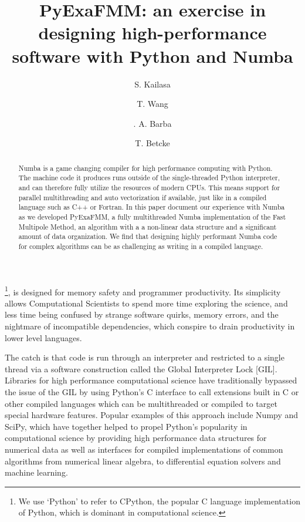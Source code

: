 \documentclass{IEEEcsmag}
\begin{document}

\title{PyExaFMM: an exercise in designing high-performance software with Python and Numba}

\author{S. Kailasa}

\author{T. Wang}

\author{. A. Barba}

\author{T. Betcke}


\begin{abstract}
    Numba is a game changing compiler for high performance computing with Python. The machine code it produces runs outside of the single-threaded Python interpreter, and can therefore fully utilize the resources of modern CPUs. This means support for parallel multithreading and auto vectorization if available, just like in a compiled language such as C++ or Fortran. In this paper document our experience with Numba as we developed PyExaFMM, a fully multithreaded Numba implementation of the Fast Multipole Method, an algorithm with a a non-linear data structure and a significant amount of data organization. We find that designing highly performant Numba code for complex algorithms can be as challenging as writing in a compiled language.
\end{abstract}

\maketitle
{}\footnote{We use `Python' to refer to CPython, the popular C language implementation of Python, which is dominant in computational science.}, is designed for memory safety and programmer productivity. Its simplicity allows Computational Scientists to spend more time exploring the science, and less time being confused by strange software quirks, memory errors, and the nightmare of incompatible dependencies, which conspire to drain productivity in lower level languages.

The catch is that code is run through an interpreter and restricted to a single thread via a software construction called the Global Interpreter Lock [GIL]. Libraries for high performance computational science have traditionally bypassed the issue of the GIL by using Python's C interface to call extensions built in C or other compiled languages which can be multithreaded or compiled to target special hardware features. Popular examples of this approach include Numpy and SciPy, which have together helped to propel Python's popularity in computational science by providing high performance data structures for numerical data as well as interfaces for compiled implementations of common algorithms from numerical linear algebra, to differential equation solvers and machine learning.
\end{document}
